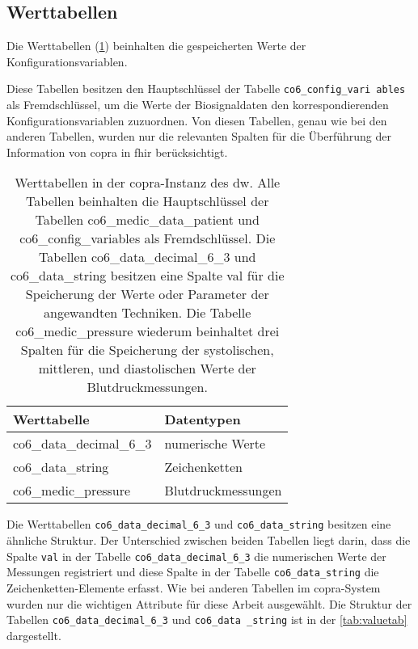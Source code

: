 \subsection{Werttabellen} \label{subsec:valuetables}

Die Werttabellen (\ref{tab:valuetable}) beinhalten die gespeicherten Werte der Konfigurationsvariablen. 

Diese Tabellen besitzen den Hauptschlüssel der Tabelle \texttt{co6\_config\_vari ables} als Fremdschlüssel, um die Werte der Biosignaldaten den korrespondierenden Konfigurationsvariablen zuzuordnen. Von diesen Tabellen, genau wie bei den anderen Tabellen, wurden nur die relevanten Spalten für die Überführung der Information von \ac{copra} in \ac{fhir} berücksichtigt.

\clearpage

\begin{table}[ht]
	\centering  
	\caption[Werttabellen in der \acs{copra}-Instanz]{Werttabellen in der \ac{copra}-Instanz des \ac{dw}. Alle Tabellen beinhalten die Hauptschlüssel der Tabellen co6\_medic\_data\_patient und co6\_config\_variables als Fremdschlüssel. Die Tabellen co6\_data\_decimal\_6\_3 und co6\_data\_string besitzen eine Spalte \glqq val\grqq{} für die Speicherung der Werte oder Parameter der angewandten Techniken. Die Tabelle co6\_medic\_pressure wiederum beinhaltet drei Spalten für die Speicherung der systolischen, mittleren, und diastolischen Werte der Blutdruckmessungen.}
	\label{tab:valuetable}
	\begin{tabular}{|l|l|}
		\hline
		\bfseries Werttabelle & \bfseries Datentypen \\ \hline
		co6\_data\_decimal\_6\_3 & numerische Werte \\ \hline
		co6\_data\_string & Zeichenketten \\ \hline
		co6\_medic\_pressure & Blutdruckmessungen \\ \hline
	\end{tabular}
\end{table}

Die Werttabellen \texttt{co6\_data\_decimal\_6\_3} und \texttt{co6\_data\_string} besitzen eine ähnliche Struktur. Der Unterschied zwischen beiden Tabellen liegt darin, dass die Spalte \texttt{val} in der Tabelle \texttt{co6\_data\_decimal\_6\_3} die numerischen Werte der Messungen registriert und diese Spalte in der Tabelle \texttt{co6\_data\_string} die Zeichenketten-Elemente erfasst. Wie bei anderen Tabellen im \ac{copra}-System wurden nur die wichtigen Attribute für diese Arbeit ausgewählt. Die Struktur der Tabellen \texttt{co6\_data\_decimal\_6\_3} und \texttt{co6\_data \_string} ist in der \ref{tab:valuetab} dargestellt.

